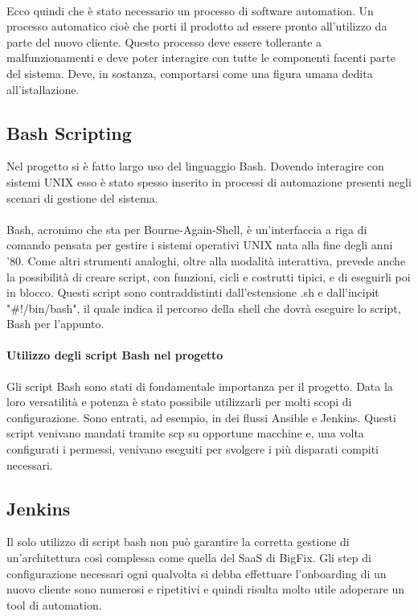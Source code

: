 \paragraph{}
Ecco quindi che è stato necessario un processo di software automation. Un processo automatico cioè che porti il prodotto ad essere pronto all'utilizzo da parte del nuovo cliente. Questo processo deve essere tollerante a malfunzionamenti e deve poter interagire con tutte le componenti facenti parte del sistema. Deve, in sostanza, comportarsi come una figura umana dedita all'istallazione. 

\subsection{Bash Scripting}
Nel progetto si è fatto largo uso del linguaggio Bash. Dovendo interagire con sistemi UNIX esso è stato spesso inserito in processi di automazione presenti negli scenari di gestione del sistema.
\paragraph{}
Bash, acronimo che sta per Bourne-Again-Shell, è un'interfaccia a riga di comando pensata per gestire i sistemi operativi UNIX nata alla fine degli anni '80. Come altri strumenti analoghi, oltre alla modalità interattiva, prevede anche la possibilità di creare script, con funzioni, cicli e costrutti tipici, e di eseguirli poi in blocco. Questi script sono contraddistinti dall'estensione .sh e dall'incipit "\#!/bin/bash", il quale indica il percorso della shell che dovrà eseguire lo script, Bash per l'appunto. 
\paragraph{Utilizzo degli script Bash nel progetto}
Gli script Bash sono stati di fondamentale importanza per il progetto. Data la loro versatilità e potenza è stato possibile utilizzarli per molti scopi di configurazione. Sono entrati, ad esempio, in dei flussi Ansible e Jenkins. Questi script venivano mandati tramite scp su opportune macchine e, una volta configurati i permessi, venivano eseguiti per svolgere i più disparati compiti necessari.
\subsection{Jenkins}
Il solo utilizzo di script bash non può garantire la corretta gestione di un'architettura così complessa come quella del SaaS di BigFix. Gli step di configurazione necessari ogni qualvolta si debba effettuare l'onboarding di un nuovo cliente sono numerosi e ripetitivi e quindi risulta molto utile adoperare un tool di automation.
